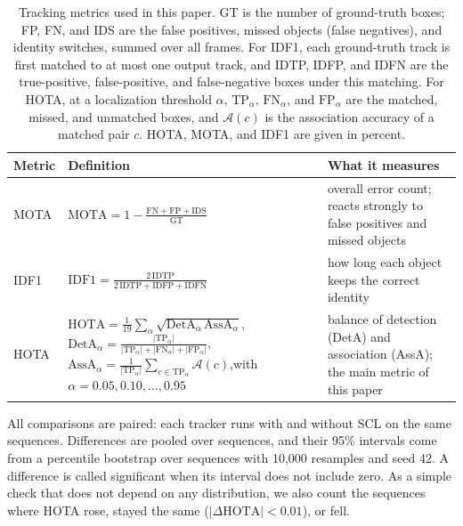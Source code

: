 \documentclass[pdflatex,referee,sn-mathphys-num]{sn-jnl}
\newcommand{\scl}{SCL}
\begin{document}
\begin{table}[t]
\caption{Tracking metrics used in this paper. GT is the number of
ground-truth boxes; FP, FN, and IDS are the false positives, missed objects
(false negatives), and identity switches, summed over all frames. For IDF1,
each ground-truth track is first matched to at most one output track, and
IDTP, IDFP, and IDFN are the true-positive, false-positive, and
false-negative boxes under this matching. For HOTA, at a localization
threshold $\alpha$, $\mathrm{TP}_\alpha$, $\mathrm{FN}_\alpha$, and
$\mathrm{FP}_\alpha$ are the matched, missed, and unmatched boxes, and
$\mathcal{A}(c)$ is the association accuracy of a matched pair $c$. HOTA,
MOTA, and IDF1 are given in percent.}
\label{tab:metrics}
\centering\footnotesize
\setlength{\tabcolsep}{4pt}
\renewcommand{\arraystretch}{1.6}
\begin{tabular}{@{}l>{\raggedright\arraybackslash}p{64mm}>{\raggedright\arraybackslash}p{46mm}@{}}
\toprule
Metric & Definition & What it measures\\
\midrule
MOTA \cite{bernardin2008clear} & $\displaystyle \mathrm{MOTA}=1-\frac{\mathrm{FN}+\mathrm{FP}+\mathrm{IDS}}{\mathrm{GT}}$ & overall error count; reacts strongly to false positives and missed objects\\
IDF1 \cite{ristani2016idf1} & $\displaystyle \mathrm{IDF1}=\frac{2\,\mathrm{IDTP}}{2\,\mathrm{IDTP}+\mathrm{IDFP}+\mathrm{IDFN}}$ & how long each object keeps the correct identity\\
HOTA \cite{luiten2021hota} & $\displaystyle \mathrm{HOTA}=\frac{1}{19}\sum_{\alpha}\sqrt{\mathrm{DetA}_\alpha\,\mathrm{AssA}_\alpha}$,\newline $\displaystyle \mathrm{DetA}_\alpha=\frac{|\mathrm{TP}_\alpha|}{|\mathrm{TP}_\alpha|+|\mathrm{FN}_\alpha|+|\mathrm{FP}_\alpha|}$,\quad $\displaystyle \mathrm{AssA}_\alpha=\frac{1}{|\mathrm{TP}_\alpha|}\sum_{c\in\mathrm{TP}_\alpha}\mathcal{A}(c)$,\newline with $\alpha=0.05,0.10,\dots,0.95$ & balance of detection (DetA) and association (AssA); the main metric of this paper\\
\bottomrule
\end{tabular}
\end{table}

All comparisons are paired: each tracker runs with and without \scl{} on
the same sequences. Differences are pooled over sequences, and their 95\%
intervals come from a percentile bootstrap over sequences
\cite{efron1993bootstrap} with 10,000 resamples and seed 42. A difference is
called significant when its interval does not include zero. As a simple
check that does not depend on any distribution, we also count the sequences
where HOTA rose, stayed the same ($|\Delta\mathrm{HOTA}|<0.01$), or fell.
\end{document}
